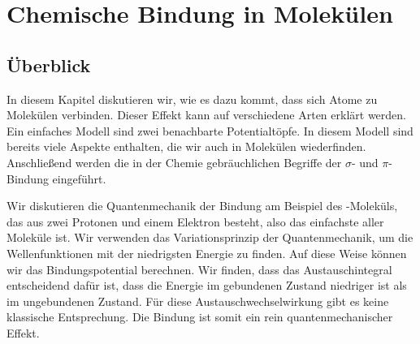 \renewcommand{\lastmod}{13. Dezember 2024} 
\renewcommand{\chapterauthors}{Markus Lippitz}

\chapter{Chemische Bindung in Molekülen}












\section{Überblick}

In diesem Kapitel diskutieren wir, wie es dazu kommt, dass sich Atome zu Molekülen verbinden. Dieser Effekt kann auf verschiedene Arten erklärt werden. Ein einfaches Modell sind zwei benachbarte Potentialtöpfe. In diesem Modell sind bereits viele Aspekte enthalten, die wir auch in Molekülen wiederfinden. Anschließend werden die in der Chemie gebräuchlichen Begriffe der $\sigma$- und $\pi$-Bindung eingeführt.
 
Wir diskutieren die Quantenmechanik der Bindung am Beispiel des -Moleküls, das aus zwei Protonen und einem Elektron besteht, also das einfachste aller Moleküle ist. Wir verwenden das Variationsprinzip der Quantenmechanik, um die Wellenfunktionen mit der niedrigsten Energie zu finden. Auf diese Weise können wir das Bindungspotential berechnen. Wir finden, dass das Austauschintegral entscheidend dafür ist, dass die Energie im gebundenen Zustand niedriger ist als im ungebundenen Zustand. Für diese Austauschwechselwirkung gibt es keine klassische Entsprechung. Die Bindung ist somit ein rein quantenmechanischer Effekt.

